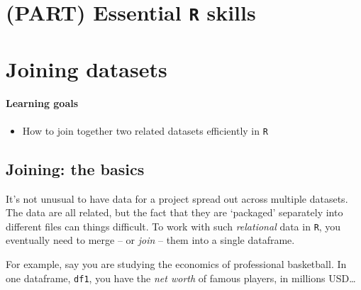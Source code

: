 \documentclass[
]{book}
\providecommand{\tightlist}{%
  \setlength{\itemsep}{0pt}\setlength{\parskip}{0pt}}
\begin{document}
\hypertarget{part-essential-r-skills}{%
\chapter*{\texorpdfstring{(PART) Essential \texttt{R} skills}{(PART) Essential R skills}}\label{part-essential-r-skills}}

\hypertarget{joining-datasets}{%
\chapter{Joining datasets}\label{joining-datasets}}

\hypertarget{learning-goals-12}{%
\subsubsection*{Learning goals}\label{learning-goals-12}}

\begin{itemize}
\tightlist
\item
  How to join together two related datasets efficiently in \texttt{R}
\end{itemize}

\hypertarget{joining-the-basics}{%
\section*{Joining: the basics}\label{joining-the-basics}}

It's not unusual to have data for a project spread out across multiple datasets. The data are all related, but the fact that they are `packaged' separately into different files can things difficult. To work with such \emph{relational} data in \texttt{R}, you eventually need to merge -- or \emph{join} -- them into a single dataframe.

For example, say you are studying the economics of professional basketball. In one dataframe, \texttt{df1}, you have the \emph{net worth} of famous players, in millions USD\ldots{}
\end{document}
